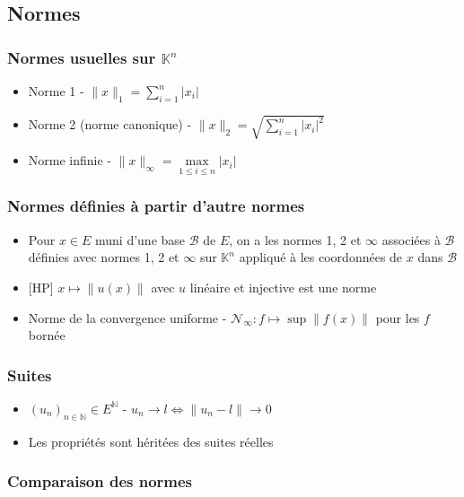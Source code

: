 \documentclass[openany]{book}
\begin{document}
\subsection{Normes}
\subsubsection{Normes usuelles sur $\mathbb{K}^n$}
\begin{itemize}
    \item Norme 1 - $\|x\|_1 = \sum_{i=1}^{n} |x_i|$
    \item Norme 2 (norme canonique) - $\|x\|_2 = \sqrt{\sum_{i=1}^{n} |x_i|^2}$
    \item Norme infinie - $\|x\|_{\infty} = \underset{1 \leq i \leq n}{\max} |x_i|$
\end{itemize}

\subsubsection{Normes définies à partir d'autre normes}

\begin{itemize}
    \item Pour $x \in E$ muni d'une base $\mathcal{B}$ de $E$, on a les normes 1, 2 et $\infty$ associées à $\mathcal{B}$ définies avec normes 1, 2 et $\infty$ sur $\mathbb{K}^n$ appliqué à les coordonnées de $x$ dans $\mathcal{B}$
    \item{} [HP] $x \mapsto \|u(x)\|$ avec $u$ linéaire et injective est une norme
    \item Norme de la convergence uniforme - $\mathcal{N}_{\infty} : f \mapsto \sup \|f(x)\| $ pour les $f$ bornée
\end{itemize}

\subsubsection{Suites}

\begin{itemize}
    \item $(u_n)_{n \in \mathbb{N}} \in E^\mathbb{N}$ - $u_n \longrightarrow l \iff \|u_n - l\| \longrightarrow 0$
    \item Les propriétés sont héritées des suites réelles
\end{itemize}

\subsubsection{Comparaison des normes}
\end{document}
